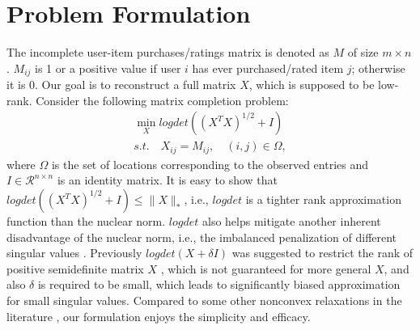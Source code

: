 \documentclass[letterpaper]{article}
\begin{document}
\section{Problem Formulation}
The incomplete user-item purchases/ratings matrix is denoted as $M$ of size $m \times n$. $M_{ij}$ is 1 or a positive value if user $i$ has ever purchased/rated item $j$; otherwise it is 0. Our goal is to reconstruct a full matrix $X$, which is supposed to be low-rank.
Consider the following matrix completion problem:
\begin{equation}
\begin{split}
\min_X logdet ((X^TX)^{1/2}+I)   \\
s.t.\quad X_{ij}=M_{ij},\quad (i,j)\in \Omega,
\end{split}
\label{originalprob}
\end{equation}
where $\Omega$ is the set of locations corresponding to the observed entries and $I\in \mathcal{R}^{n\times n}$ is an identity matrix. It is easy to show that $logdet((X^TX)^{1/2}+I)\leq\|X\|_*$, i.e., $logdet$ is a tighter rank approximation function than the nuclear norm. $logdet$ also helps mitigate another inherent disadvantage of the nuclear norm, i.e., the imbalanced penalization of different singular values \cite{kang2015robust}. Previously $logdet(X+\delta I)$ was suggested to restrict the rank of positive semidefinite matrix $X$ \cite{fazel2003log}, which is not guaranteed for more general $X$, and also $\delta$ is required to be small, which leads to significantly biased approximation for small singular values. Compared to some other nonconvex relaxations in the literature \cite{lu2014generalized}, our formulation enjoys the simplicity and efficacy.
\end{document}

